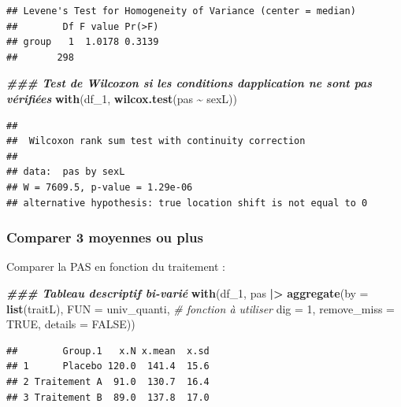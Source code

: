 \documentclass[
]{book}
\newenvironment{Shaded}{\begin{snugshade}}{\end{snugshade}}
\newcommand{\AttributeTok}[1]{\textcolor[rgb]{0.13,0.29,0.53}{#1}}
\newcommand{\CommentTok}[1]{\textcolor[rgb]{0.56,0.35,0.01}{\textit{#1}}}
\newcommand{\ConstantTok}[1]{\textcolor[rgb]{0.56,0.35,0.01}{#1}}
\newcommand{\DecValTok}[1]{\textcolor[rgb]{0.00,0.00,0.81}{#1}}
\newcommand{\DocumentationTok}[1]{\textcolor[rgb]{0.56,0.35,0.01}{\textbf{\textit{#1}}}}
\newcommand{\FunctionTok}[1]{\textcolor[rgb]{0.13,0.29,0.53}{\textbf{#1}}}
\newcommand{\NormalTok}[1]{#1}
\newcommand{\SpecialCharTok}[1]{\textcolor[rgb]{0.81,0.36,0.00}{\textbf{#1}}}
\begin{document}
\begin{verbatim}
## Levene's Test for Homogeneity of Variance (center = median)
##        Df F value Pr(>F)
## group   1  1.0178 0.3139
##       298
\end{verbatim}

\begin{Shaded}
\begin{Highlighting}[]
\DocumentationTok{\#\#\# Test de Wilcoxon si les conditions d\textquotesingle{}application ne sont pas vérifiées}
\FunctionTok{with}\NormalTok{(df\_1,}
     \FunctionTok{wilcox.test}\NormalTok{(pas }\SpecialCharTok{\textasciitilde{}}\NormalTok{ sexL))}
\end{Highlighting}
\end{Shaded}

\begin{verbatim}
## 
##  Wilcoxon rank sum test with continuity correction
## 
## data:  pas by sexL
## W = 7609.5, p-value = 1.29e-06
## alternative hypothesis: true location shift is not equal to 0
\end{verbatim}

\subsubsection{Comparer 3 moyennes ou plus}\label{comparer-3-moyennes-ou-plus-1}

Comparer la PAS en fonction du traitement :

\begin{Shaded}
\begin{Highlighting}[]
\DocumentationTok{\#\#\# Tableau descriptif bi{-}varié}
\FunctionTok{with}\NormalTok{(df\_1,}
\NormalTok{     pas }\SpecialCharTok{|\textgreater{}}
       \FunctionTok{aggregate}\NormalTok{(}\AttributeTok{by =} \FunctionTok{list}\NormalTok{(traitL), }
                 \AttributeTok{FUN =}\NormalTok{ univ\_quanti, }\CommentTok{\# fonction à utiliser}
                 \AttributeTok{dig =} \DecValTok{1}\NormalTok{, }\AttributeTok{remove\_miss =} \ConstantTok{TRUE}\NormalTok{, }\AttributeTok{details =} \ConstantTok{FALSE}\NormalTok{)) }
\end{Highlighting}
\end{Shaded}

\begin{verbatim}
##        Group.1   x.N x.mean  x.sd
## 1      Placebo 120.0  141.4  15.6
## 2 Traitement A  91.0  130.7  16.4
## 3 Traitement B  89.0  137.8  17.0
\end{verbatim}
\end{document}
